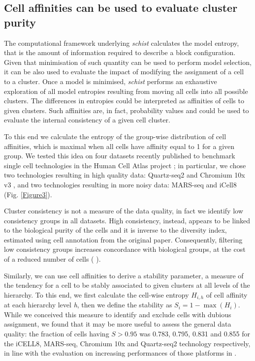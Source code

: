 \documentclass[10pt,letterpaper]{article}
\begin{document}
\subsection*{Cell affinities can be used to evaluate cluster purity}
The computational framework underlying \emph{schist} calculates the model entropy, that is the amount of information required to describe a block configuration. Given that minimisation of such quantity can be used to perform model selection, it can be also used to evaluate the impact of modifying the assignment of a cell to a cluster. Once a model is minimised, \emph{schist} performs an exhaustive exploration of all model entropies resulting from moving all cells into all possible clusters. The differences in entropies could be interpreted as affinities of cells to given clusters. Such affinities are, in fact, probability values and could be used to evaluate the internal consistency of a given cell cluster. 

To this end we calculate the entropy of the group-wise distribution of cell affinities, which is maximal when all cells have affinity equal to 1 for a given group. We tested this idea on four datasets recently published to benchmark single cell technologies in the Human Cell Atlas project \cite{mereu_2020}; in particular, we chose two technologies resulting in high quality data: Quartz-seq2 \cite{sasagawa_2018} and Chromium 10x v3 \cite{zheng_2017}, and two technologies resulting in more noisy data: MARS-seq \cite{jaitin_2014} and iCell8 \cite{goldstein_2017} (Fig. \ref{Figure3}).

Cluster consistency is not a measure of the data quality, in fact we identify low consistency groups in all datasets. High consistency, instead, appears to be linked to the biological purity of the cells and it is inverse to the diversity index, estimated using cell annotation from the original paper. Consequently, filtering low consistency groups increases concordance with biological groups, at the cost of a reduced number of cells ( ). 

Similarly, we can use cell affinities to derive a stability parameter, a measure of the tendency for a cell to be stably associated to given clusters at all levels of the hierarchy. To this end, we first calculate the cell-wise entropy $H_{i,h}$ of cell affinity at each hierarchy level \emph{h}, then we define the stability as $S_i = 1 - \max(H_i)$. While we conceived this measure to identify and exclude cells with dubious assignment, we found that it may be more useful to assess the general data quality: the fraction of cells having $S>0.95$ was 0.783, 0.795, 0.831 and 0.855 for the iCELL8, MARS-seq, Chromium 10x and Quartz-seq2 technology respectively, in line with the evaluation on increasing performances of those platforms in \cite{mereu_2020}.
\end{document}
